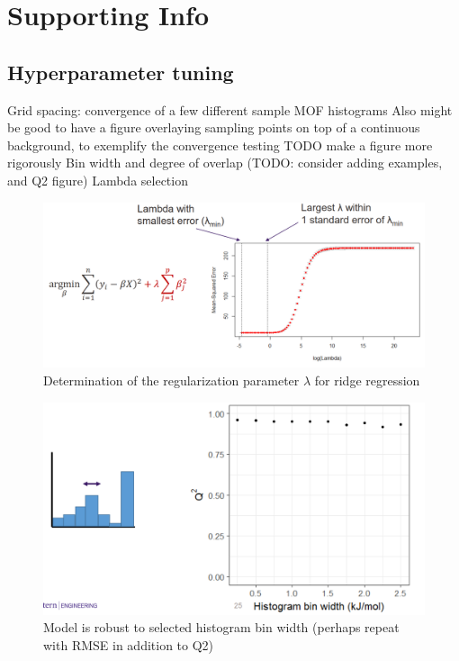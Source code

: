\documentclass[letterpaper]{article}
\begin{document}
\pagebreak
\section{Supporting Info}

\subsection{Hyperparameter tuning}

\begin{outline}
	\1 Grid spacing: convergence of a few different sample MOF histograms
		\2 Also might be good to have a figure overlaying sampling points on top of a continuous background, to exemplify the convergence testing
		\2 TODO make a figure more rigorously
	\1 Bin width and degree of overlap (TODO: consider adding examples, and Q2 figure)
	\1 Lambda selection
	\begin{figure}[H]
		\centering
		\includegraphics[width=0.75\columnwidth]{Figs/lambda.png}
		\caption{Determination of the regularization parameter $\lambda$ for ridge regression}
		\label{fig:lambda}
	\end{figure}
\end{outline}

\begin{figure}[H]
	\centering
	\includegraphics[width=0.75\columnwidth]{Figs/tuning_bin_width.png}
	\caption{Model is robust to selected histogram bin width (perhaps repeat with RMSE in addition to Q2)}
	\label{fig:robustness_q2}
\end{figure}
\end{document}
